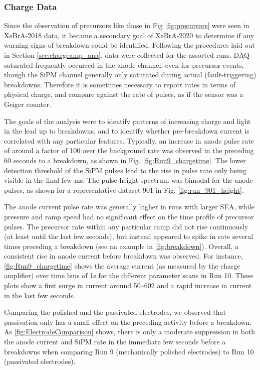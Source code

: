 \subsubsection{Charge Data}
Since the observation of precursors like those in Fig \ref{fig:precursors} were seen in XeBrA-2018 data, it became a secondary goal of XeBrA-2020 to determine if any warning signs of breakdown could be identified.
Following the procedures laid out in Section \ref{sec:chargeamp_ana}, data were collected for the assorted runs.
DAQ saturated  frequently occurred in the anode channel, even for precursor events, though the SiPM channel generally only saturated during actual (fault-triggering) breakdowns.
Therefore it is sometimes necessary to report rates in terms of physical charge, and compare against the rate of pulses, as if the sensor was a Geiger counter.

The goals of the analysis were to identify patterns of increasing charge and light in the lead up to breakdowns, and to identify whether pre-breakdown current is correlated with any particular features.
Typically, an increase in anode pulse rate of around a factor of 100 over the background rate was observed in the preceding 60 seconds to a breakdown, as shown in Fig. \ref{fig:Run9_chargetime}.
The lower detection threshold of the SiPM pulses lead to the rise in pulse rate only being visible in the final few ms.
The pulse height spectrum was bimodal for the anode pulses, as shown for a representative dataset 901 in Fig. \ref{fig:run_901_height}.

The anode current pulse rate was generally higher in runs with larger SEA, while pressure and ramp speed had no significant effect on the time profile of precursor pulses.
The precursor rate within any particular ramp did not rise continuously (at least until the last few seconds), but instead appeared to spike in rate several times preceding a breakdown (see an example in \ref{fig:breakdown}).
Overall, a consistent rise in anode current before breakdown was observed.
For instance, \ref{fig:Run9_chargetime} shows the average current (as measured by the charge amplifier) over time bins of 1s for the different parameter scans in Run 10.
These plots show a first surge in current around 50--602 and a rapid increase in current in the last few seconds.

Comparing the polished and the passivated electrodes, we observed that passivation only has a small effect on the preceding activity before a breakdown.
As \ref{fig:ElectrodeComparison} shows, there is only a moderate suppression in both the anode current and SiPM rate in the immediate few seconds before a breakdowns when comparing Run 9 (mechanically polished electrodes) to Run 10 (passivated electrodes).

